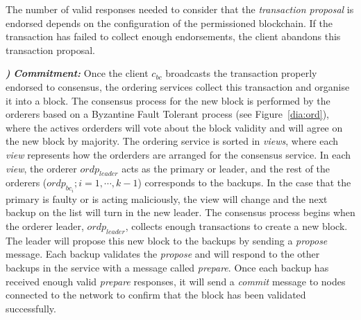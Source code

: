 \documentclass[conference]{llncs}
\newcounter{paranum}
\newcommand{\Par}{\vspace{10pt}\noindent\textbf{\refstepcounter{paranum}\theparanum}\textbf\textit) }
\begin{document}
The number of valid responses needed to consider that the \textit{transaction proposal} is endorsed depends on the configuration of the permissioned blockchain. If the transaction has failed to collect enough endorsements, the client abandons this transaction proposal.

\Par{\textit{\textbf{Commitment:}}} Once the client $c_{bc}$ broadcasts the transaction properly endorsed to consensus, the ordering services collect this transaction and organise it into a block. The consensus process for the new block is performed by the orderers based on a Byzantine Fault Tolerant process (see Figure~\ref{dia:ord}), where the actives orderders will vote about the block validity and will agree on the new block by majority. The ordering service is sorted in \textit{views}, where each \textit{view} represents how the orderders are arranged for the consensus service. In each \textit{view}, the orderer $ordp_{leader}$ acts as the primary or leader, and the rest of the orderers ($ordp_{bc_{i}}; i=1,\cdots,k-1$) corresponds to the backups. In the case that the primary is faulty or is acting maliciously, the view will change and the next backup on the list will turn in the new leader. The consensus process begins when the orderer leader, $ordp_{leader}$, collects enough transactions to create a new block. The leader will propose this new block to the backups by sending a \emph{propose} message. Each backup validates the \emph{propose} and will respond to the other backups in the service with a message called \emph{prepare}. Once each backup has received enough valid \emph{prepare} responses, it will send a \emph{commit} message to nodes connected to the network to confirm that the block has been validated successfully. 
\end{document}
